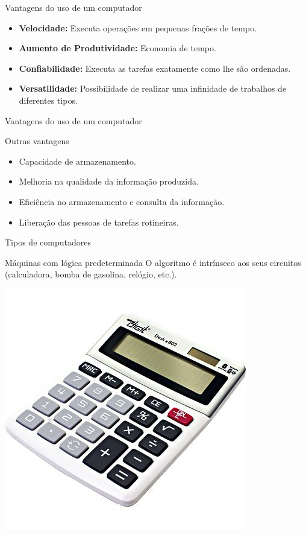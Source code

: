 \begin{frame}{Vantagens do uso de um computador}
	\begin{block}{}
		\begin{itemize}
			\item \textbf{Velocidade:} Executa operações em pequenas frações de tempo.
			\item \textbf{Aumento de  Produtividade:} Economia de tempo.
			\item \textbf{Confiabilidade:} Executa as tarefas exatamente como lhe são ordenadas.
			\item \textbf{Versatilidade:} Possibilidade de realizar uma infinidade de trabalhos de diferentes tipos.
		\end{itemize}
	\end{block}
\end{frame}


\begin{frame}{Vantagens do uso de um computador}
	\begin{block}{Outras vantagens}
		\begin{itemize}
			\item Capacidade de armazenamento.
			\item Melhoria na qualidade da informação produzida.
			\item Eficiência no armazenamento e consulta da informação.
			\item Liberação das pessoas de tarefas rotineiras.
		\end{itemize}
	\end{block}
\end{frame}


\begin{frame}{Tipos de computadores}
	\begin{block}{Máquinas com lógica predeterminada}
		O algoritmo é intrínseco aos seus circuitos (calculadora, bomba de gasolina, relógio, etc.).
	\end{block}

	\centering
	\includegraphics[width=0.5\linewidth]{Figuras/Ch01/fig10}
\end{frame}


